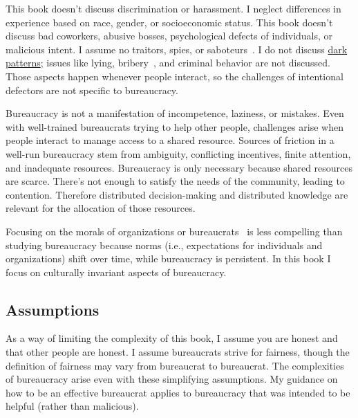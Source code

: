 This book doesn't discuss discrimination or harassment. I neglect differences in experience based on race, gender, or socioeconomic status. This book doesn't discuss bad coworkers, abusive bosses, psychological defects of individuals, or malicious intent. I assume no traitors, spies, \iftoggle{WPinmargin}{\marginpar{$>$Wikipedia: saboteurs}}{}
or saboteurs~\cite{1944_War_Dept}. I do not discuss \href{https://en.wikipedia.org/wiki/Dark_pattern}{dark patterns}; 
issues like lying, bribery~\cite{2021_Ang}, and criminal behavior are not discussed. Those aspects happen whenever people interact, so  the challenges of intentional defectors are not specific to bureaucracy. 

Bureaucracy is not a manifestation of incompetence, laziness, or mistakes.
Even with well-trained bureaucrats trying to help other people, challenges arise when people interact to manage access to a shared resource. 
Sources of friction in a well-run bureaucracy stem from  ambiguity, conflicting incentives, finite attention, and inadequate resources. Bureaucracy is only necessary because shared resources are scarce. There's not enough to satisfy the needs of the community, leading to contention. Therefore distributed decision-making and distributed knowledge are relevant for the allocation of those resources.


Focusing on the morals of organizations or bureaucrats~\cite{2009_Jackall} is less compelling than studying bureaucracy because norms (i.e., expectations for individuals and organizations) shift over time, while bureaucracy is persistent. 
In this book I focus on culturally invariant aspects of bureaucracy. 


\subsection*{Assumptions}
As a way of limiting the complexity of this book, I assume you are honest and that other people are honest. 
I assume bureaucrats strive for fairness, though the definition of fairness may vary from bureaucrat to bureaucrat. 
The complexities of bureaucracy arise even with these simplifying assumptions.%
My guidance on how to be an effective bureaucrat applies to  bureaucracy that was intended to be helpful (rather than malicious).



